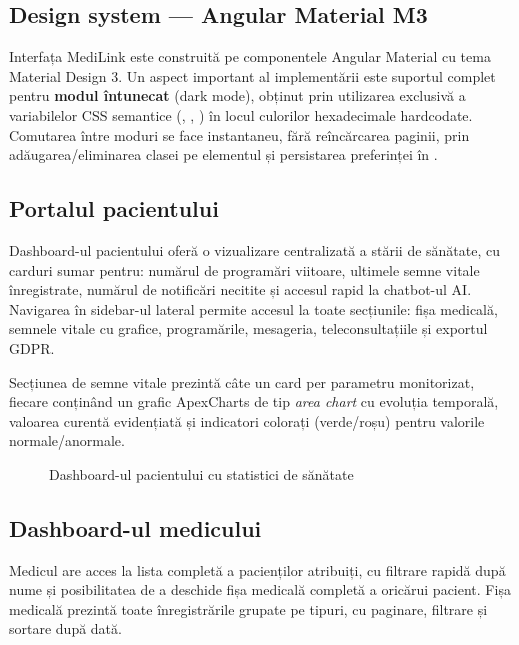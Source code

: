 \subsection{Design system --- Angular Material M3}

Interfața MediLink este construită pe componentele Angular Material cu tema Material Design 3. Un aspect important al implementării este suportul complet pentru \textbf{modul întunecat} (dark mode), obținut prin utilizarea exclusivă a variabilelor CSS semantice (, , ) în locul culorilor hexadecimale hardcodate. Comutarea între moduri se face instantaneu, fără reîncărcarea paginii, prin adăugarea/eliminarea clasei  pe elementul  și persistarea preferinței în .

\subsection{Portalul pacientului}

Dashboard-ul pacientului oferă o vizualizare centralizată a stării de sănătate, cu carduri sumar pentru: numărul de programări viitoare, ultimele semne vitale înregistrate, numărul de notificări necitite și accesul rapid la chatbot-ul AI. Navigarea în sidebar-ul lateral permite accesul la toate secțiunile: fișa medicală, semnele vitale cu grafice, programările, mesageria, teleconsultațiile și exportul GDPR.

Secțiunea de semne vitale prezintă câte un card per parametru monitorizat, fiecare conținând un grafic ApexCharts de tip \textit{area chart} cu evoluția temporală, valoarea curentă evidențiată și indicatori colorați (verde/roșu) pentru valorile normale/anormale.

\begin{figure}[H]
  \centering
  \caption{Dashboard-ul pacientului cu statistici de sănătate}
  \label{fig:dashboard_pacient}
\end{figure}

\subsection{Dashboard-ul medicului}

Medicul are acces la lista completă a pacienților atribuiți, cu filtrare rapidă după nume și posibilitatea de a deschide fișa medicală completă a oricărui pacient. Fișa medicală prezintă toate înregistrările grupate pe tipuri, cu paginare, filtrare și sortare după dată.

